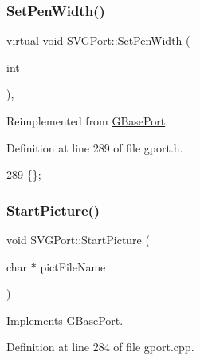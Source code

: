 \subsubsection{\texorpdfstring{Set\+Pen\+Width()}{SetPenWidth()}}
{\footnotesize\ttfamily virtual void S\+V\+G\+Port\+::\+Set\+Pen\+Width (\begin{DoxyParamCaption}\item[{int}]{ }\end{DoxyParamCaption})\hspace{0.3cm}{\ttfamily [inline]}, {\ttfamily [virtual]}}



Reimplemented from \mbox{\hyperlink{class_g_base_port_aa2fd1fbe050cfea5a21afb7d4cecaa61}{G\+Base\+Port}}.



Definition at line 289 of file gport.\+h.


\begin{DoxyCode}
289 \{\};
\end{DoxyCode}
\mbox{\label{class_s_v_g_port_a930228d552d729c5aeb0aa8fb731d303}} 
\subsubsection{\texorpdfstring{Start\+Picture()}{StartPicture()}}
{\footnotesize\ttfamily void S\+V\+G\+Port\+::\+Start\+Picture (\begin{DoxyParamCaption}\item[{char $\ast$}]{pict\+File\+Name }\end{DoxyParamCaption})\hspace{0.3cm}{\ttfamily [virtual]}}



Implements \mbox{\hyperlink{class_g_base_port_aad9e21ed63c4f04a508e30b7f100fba5}{G\+Base\+Port}}.



Definition at line 284 of file gport.\+cpp.


